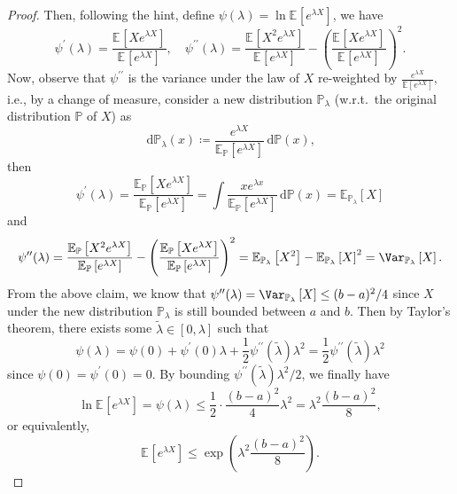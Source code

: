 \begin{proof}
	Then, following the hint, define \(\psi (\lambda ) = \ln \mathbb{E}_{}\left[e^{\lambda X} \right] \), we have
	\[
		\psi ^{\prime} (\lambda ) = \frac{\mathbb{E}_{}\left[X e^{\lambda X} \right] }{\mathbb{E}_{}\left[e^{\lambda X} \right] },\quad
		\psi ^{\prime\prime} (\lambda ) = \frac{\mathbb{E}_{}\left[X^2 e^{\lambda X} \right] }{\mathbb{E}_{}\left[e^{\lambda X} \right] } - \left( \frac{\mathbb{E}_{}\left[X e^{\lambda X} \right] }{\mathbb{E}_{}\left[e^{\lambda X} \right] } \right) ^2.
	\]
	Now, observe that \(\psi ^{\prime\prime} \) is the variance under the law of \(X\) re-weighted by \(\frac{e^{\lambda X}}{\mathbb{E}_{}\left[e^{\lambda X} \right] }\), i.e., by a change of measure, consider a new distribution \(\mathbb{P} _\lambda \) (w.r.t.\ the original distribution \(\mathbb{P} \) of \(X\)) as
	\[
		\,\mathrm{d} \mathbb{P} _\lambda (x) \coloneqq \frac{e^{\lambda X}}{\mathbb{E}_{\mathbb{P} }\left[e^{\lambda X} \right] }\,\mathrm{d} \mathbb{P} (x),
	\]
	then
	\[
		\psi ^{\prime} (\lambda )
		= \frac{\mathbb{E}_{\mathbb{P} }\left[X e^{\lambda X} \right] }{\mathbb{E}_{\mathbb{P} }\left[e^{\lambda X} \right] }
		= \int \frac{x e^{\lambda x}}{\mathbb{E}_{\mathbb{P} }\left[ e^{\lambda X}\right] } \,\mathrm{d} \mathbb{P} (x)
		= \mathbb{E}_{\mathbb{P} _\lambda }\left[ X \right]
	\]
	and
	\[
		\psi ^{\prime\prime} (\lambda )
		= \frac{\mathbb{E}_{\mathbb{P} }\left[ X^2 e^{\lambda X} \right] }{\mathbb{E}_{\mathbb{P} }\left[ e^{\lambda X} \right] } - \left( \frac{\mathbb{E}_{\mathbb{P} }\left[ X e^{\lambda X} \right] }{\mathbb{E}_{\mathbb{P} }\left[ e^{\lambda X}\right] } \right) ^2
		= \mathbb{E}_{\mathbb{P} _\lambda }\left[ X^2 \right] - \mathbb{E}_{\mathbb{P} _\lambda }\left[ X \right] ^2
		= \Var_{\mathbb{P} _\lambda }\left[X \right] .
	\]
	From the above claim, we know that \(\psi ^{\prime\prime} (\lambda ) = \Var_{\mathbb{P} _\lambda }\left[X \right] \leq (b-a)^2 / 4\) since \(X\) under the new distribution \(\mathbb{P} _\lambda \) is still bounded between \(a\) and \(b\). Then by Taylor's theorem, there exists some \(\widetilde{\lambda} \in [0, \lambda ]\) such that
	\[
		\psi (\lambda )
		= \psi (0) + \psi ^{\prime} (0) \lambda + \frac{1}{2} \psi ^{\prime\prime} (\widetilde{\lambda} )\lambda ^{2}
		= \frac{1}{2} \psi ^{\prime\prime} (\widetilde{\lambda} )\lambda ^{2}
	\]
	since \(\psi (0) = \psi ^{\prime} (0) = 0\). By bounding \(\psi ^{\prime\prime} (\widetilde{\lambda} )\lambda ^{2} / 2\), we finally have
	\[
		\ln \mathbb{E}_{}\left[e^{\lambda X} \right] = \psi (\lambda ) \leq \frac{1}{2}\cdot \frac{(b-a)^{2} }{4}\lambda ^{2} = \lambda ^{2} \frac{(b-a)^2}{8},
	\]
	or equivalently,
	\[
		\mathbb{E}_{}\left[e^{\lambda X} \right] \leq \exp \left( \lambda ^2 \frac{(b-a)^2}{8} \right) .
	\]
\end{proof}


